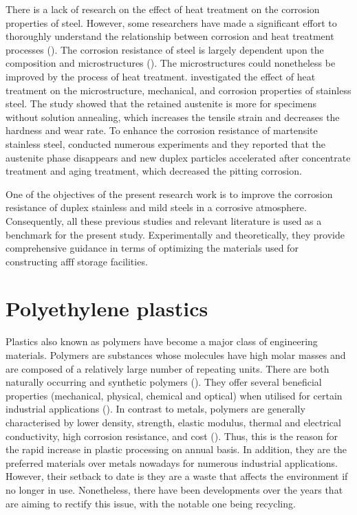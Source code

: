 There is a lack of research on the effect of heat treatment on the corrosion properties of steel. However, some researchers have made a significant effort to thoroughly understand the relationship between corrosion and heat treatment processes (\cite{whitman1924effect, hackerman1987theory}). The corrosion resistance of steel is largely dependent upon the composition and microstructures (\cite{wang2020enhancing}). The microstructures could nonetheless be improved by the process of heat treatment. \cite{sarkar2020effects} investigated the effect of heat treatment on the microstructure, mechanical, and corrosion properties of stainless steel. The study showed that the retained austenite is more for specimens without solution annealing, which increases the tensile strain and decreases the hardness and wear rate. To enhance the corrosion resistance of martensite stainless steel, \cite{wang2020enhancing} conducted numerous experiments and they reported that the austenite phase disappears and new duplex particles accelerated after concentrate treatment and aging treatment, which decreased the pitting corrosion. 

One of the objectives of the present research work is to improve the corrosion resistance of duplex stainless and mild steels in a corrosive atmosphere. Consequently, all these previous studies and relevant literature is used as a benchmark for the present study. Experimentally and theoretically, they provide comprehensive guidance in terms of optimizing the materials used for constructing \acrshort{afff} storage facilities.

\section{Polyethylene plastics}
Plastics also known as polymers have become a major class of engineering materials. Polymers are substances whose molecules have high molar masses and are composed of a relatively large number of repeating units. There are both naturally occurring and synthetic polymers (\cite{roslan2013effect}). They offer several beneficial properties (mechanical, physical, chemical and optical) when utilised for certain industrial applications (\cite{nugent2017rotational}). In contrast to metals, polymers are generally characterised by lower density, strength, elastic modulus, thermal and electrical conductivity, high corrosion resistance, and cost (\cite{roslan2013effect}). Thus, this is the reason for the rapid increase in plastic processing on annual basis. In addition, they are the preferred materials over metals nowadays for numerous industrial applications. However, their setback to date is they are a waste that affects the environment if no longer in use. Nonetheless, there have been developments over the years that are aiming to rectify this issue, with the notable one being recycling.  

